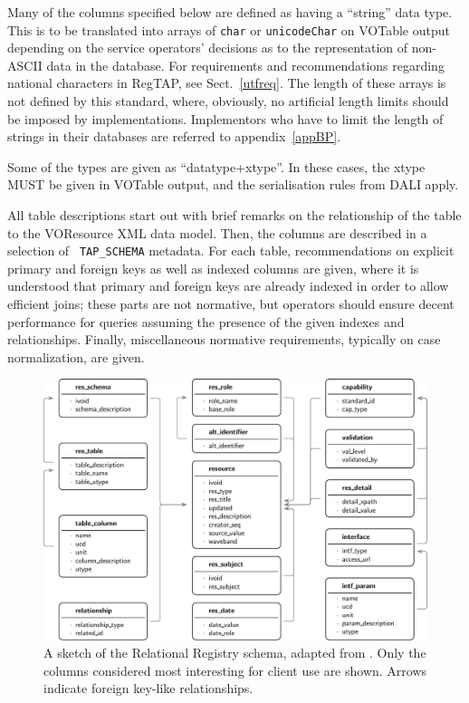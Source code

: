 \documentclass[11pt,a4paper]{ivoa}
\newcommand{\tapent}[1]{\texttt{\color{tapcolor} #1}}
\begin{document}
Many of the columns specified below are defined as having a ``string'' 
data type.  This is to be translated into arrays of \texttt{char} or
\texttt{unicodeChar} on VOTable output depending on the service
operators' decisions as to the representation of non-ASCII data in the
database.  For requirements and recommendations regarding national
characters in RegTAP, see Sect.~\ref{utfreq}.  The length of these
arrays is not defined by this standard, where, obviously, no artificial
length limits should be imposed by implementations.  Implementors who have
to limit the length of strings in their databases are referred to
appendix~\ref{appBP}.

Some of the types are given as ``datatype+xtype''.  In these cases, the
xtype MUST be given in VOTable output, and the serialisation rules from
DALI \citep{2017ivoa.spec.0517D} apply.

All table descriptions start out with brief remarks on the
relationship of the table to the VOResource XML data model.  Then, the
columns are described in a selection of \tapent{TAP\_SCHEMA} metadata. For each
table, recommendations on explicit primary and foreign keys as well as
indexed columns are given, where it is understood that primary and
foreign keys are already indexed in order to allow efficient joins;
these parts are not normative, but operators should ensure decent
performance for queries assuming the presence of the given indexes and
relationships.  Finally, miscellaneous normative requirements, typically
on case normalization, are given.


\begin{figure}

\includegraphics[width=\textwidth]{schema.pdf}
\caption{A sketch of the
Relational Registry schema, adapted from \citet{regtap-adass}.  
Only the columns considered
most interesting for client use are shown.  Arrows indicate foreign
key-like relationships.}
\end{figure}
\end{document}
